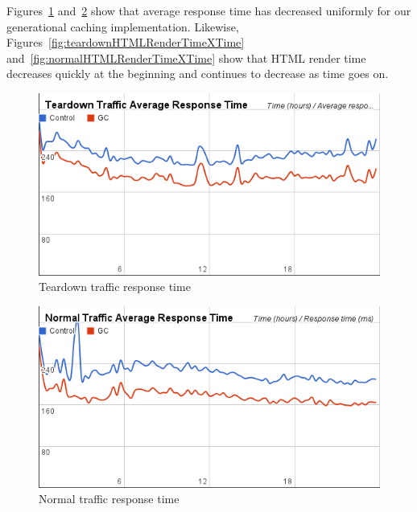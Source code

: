 \documentclass[12pt]{ucthesis}
\begin{document}
Figures~\ref{fig:teardownRespTimeXTime} and~\ref{fig:normalRespTimeXTime} show that average response time has decreased uniformly for our generational caching implementation.
Likewise, Figures~\ref{fig:teardownHTMLRenderTimeXTime} and~\ref{fig:normalHTMLRenderTimeXTime} show that HTML render time decreases quickly at the beginning and continues to decrease as time goes on.

\begin{figure}[htp]
\centering
\includegraphics[width=\textwidth]{assets/teardownRespTimeXTime.png}
\caption{Teardown traffic response time}
\label{fig:teardownRespTimeXTime}
\end{figure}

\begin{figure}[htp]
\centering
\includegraphics[width=\textwidth]{assets/normalRespTimeXTime.png}
\caption{Normal traffic response time}
\label{fig:normalRespTimeXTime}
\end{figure}
\end{document}

